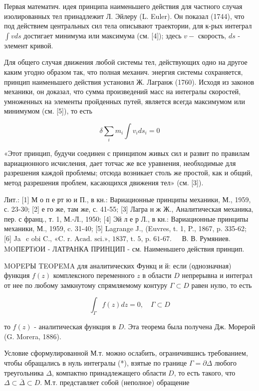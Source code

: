 \documentclass[10pt]{article}
\begin{document}
Первая математич. идея принципа наименьшего действия для частного случая изолированных тел принадлежит Л. Эйлеру (L. Euler). Он показал (1744), что под действием центральных сил тела описывают траектории, для к-рых интеграл $\int v d s$ достигает минимума или максимума (см. [4]); здесь $v-$ скорость, $d s$ - элемент кривой.



Для общего случая движения любой системы тел, действующих одно на другое каким угодно образом так, что полная механич. энергия системы сохраняется, принцип наименьшего действия установил Ж. Лагранж (1760). Исходя из законов механики, он доказал, что сумма произведений масс на интегралы скоростей, умноженных на элементы пройденных путей, является всегда максимумом или минимумом (см. [5]), то есть



\[

\delta \sum_{i} m_{i} \int v_{i} d s_{i}=0

\]



«Этот принцип, будучи соединен с принципом живых сил и развит по правилам вариационного исчисления, дает тотчас же все уравнения, необходимые для разрешения каждой проблемы; отсюда возникает столь же простой, как и общий, метод разрешения проблем, касающихся движения тел» (см. [3]).



Лит.: [1] М о п е рт ю и П., в кн.: Вариационные принципы механики, М., 1959, с. 23-30; [2] е го же, там же, с. 41-55; [3] Лагра н ж Ж., Аналитическая механика, пер. с франц., т. 1, М.-Л., 1950; [4] Эй л е р Л., в кн.: Вариационные принципы механики, М., 1959, c. 31-40; [5] Lagrange J., (Euvres, t. 1, P., 1867, p. 335-62; [6] Ja$\begin{array}{ll}\text { c obi C., «C. r. Acad. sci.», 1837, t. 5, p. 61-67. } & \text { В. В. Румяниев. }\end{array}$ MOПЕРТіОИ - ЛАТРАНКА ПРИНЦИП - см. Наименьшего действия принцип.



MOPEPЫ TEOPEMA для аналитических Функц и й: если (однозначная) функция $f(z)$ комплексного переменного $z$ в области $D$ непрерывна и интеграл от нее по любому замкнутому спрямляемому контуру $\Gamma \subset D$ равен нулю, то есть



\[

\int_{\Gamma} f(z) d z=0, \quad \Gamma \subset D

\]



то $f(z)$ - аналитическая функция в $D$. Эта теорема была получена Дж. Морерой (G. Morera, 1886).



Условие сформулированной М.т. можно ослабить, ограничившись требованием, чтобы обращались в нуль интегралы (*), взятые по границе $\Gamma=\partial \Delta$ любого треугольника $\Delta$, компактно принадлежащего области $D$, то есть такого, что $\Delta \subset \bar{\Delta} \subset D$. М.т. представляет собой (неполное) обращение
\end{document}
